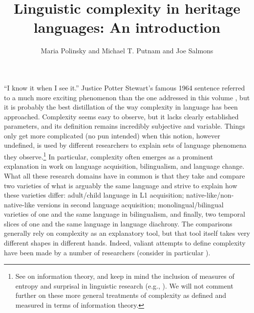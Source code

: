 \documentclass[output=paper,colorlinks,citecolor=brown]{langscibook}
\author{Maria Polinsky\orcid{0000-0003-1460-5089}\affiliation{University of Maryland, College Park} and Michael T. Putnam\orcid{0000-0002-7758-8266}\affiliation{Penn State University; University of Greenwich (CREL)} and Joe Salmons\orcid{}\affiliation{University of Wisconsin – Madison}}
\title{Linguistic complexity in heritage languages: An introduction}
\begin{document}
\maketitle 

\noindent “I know it when I see it.” Justice Potter Stewart’s famous 1964 sentence referred to a much more exciting phenomenon than the one addressed in this volume \citep{Gewirtz1996}, but it is probably the best distillation of the way complexity in language has been approached. Complexity seems easy to observe, but it lacks clearly established parameters, and its definition remains incredibly subjective and variable. Things only get more complicated (no pun intended) when this notion, however undefined, is used by different researchers to explain sets of language phenomena they observe.\footnote{See \citet{shannon48a,shannon48b} on information theory, and keep in mind the inclusion of measures of entropy and surprisal in linguistic research  (e.g., \citealt{Levy2008}). We will not comment further on these more general treatments of complexity as defined and measured in terms of information theory.} In particular, complexity often emerges as a prominent explanation in work on language acquisition, bilingualism, and language change. What all these research domains have in common is that they take and compare two varieties of what is arguably the same language and strive to explain how these varieties differ: adult/child language in L1 acquisition; native\hyp like\slash non-native\hyp like versions in second language acquisition; monolingual\slash bilingual varieties of one and the same language in bilingualism, and finally, two temporal slices of one and the same language in language diachrony. The comparisons generally rely on complexity as an explanatory tool, but that tool itself takes very different shapes in different hands. Indeed, valiant attempts to define complexity have been made by a number of researchers (consider in particular \citealt{Culicover2013,Dahl2004,MiestamoEtAl2008,Trudgill2011}).
\end{document}
